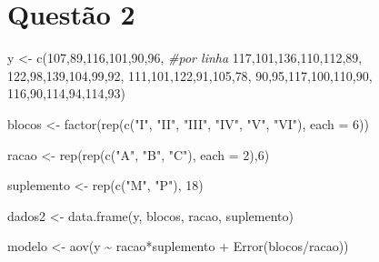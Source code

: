 \documentclass[
]{article}
\newenvironment{Shaded}{\begin{snugshade}}{\end{snugshade}}
\newcommand{\AttributeTok}[1]{\textcolor[rgb]{0.77,0.63,0.00}{#1}}
\newcommand{\CommentTok}[1]{\textcolor[rgb]{0.56,0.35,0.01}{\textit{#1}}}
\newcommand{\DecValTok}[1]{\textcolor[rgb]{0.00,0.00,0.81}{#1}}
\newcommand{\FunctionTok}[1]{\textcolor[rgb]{0.00,0.00,0.00}{#1}}
\newcommand{\NormalTok}[1]{#1}
\newcommand{\OtherTok}[1]{\textcolor[rgb]{0.56,0.35,0.01}{#1}}
\newcommand{\SpecialCharTok}[1]{\textcolor[rgb]{0.00,0.00,0.00}{#1}}
\newcommand{\StringTok}[1]{\textcolor[rgb]{0.31,0.60,0.02}{#1}}
\begin{document}
\hypertarget{questuxe3o-2}{%
\section{Questão 2}\label{questuxe3o-2}}

\begin{Shaded}
\begin{Highlighting}[]
\NormalTok{y }\OtherTok{\textless{}{-}} \FunctionTok{c}\NormalTok{(}\DecValTok{107}\NormalTok{,}\DecValTok{89}\NormalTok{,}\DecValTok{116}\NormalTok{,}\DecValTok{101}\NormalTok{,}\DecValTok{90}\NormalTok{,}\DecValTok{96}\NormalTok{, }\CommentTok{\#por linha}
\DecValTok{117}\NormalTok{,}\DecValTok{101}\NormalTok{,}\DecValTok{136}\NormalTok{,}\DecValTok{110}\NormalTok{,}\DecValTok{112}\NormalTok{,}\DecValTok{89}\NormalTok{,}
\DecValTok{122}\NormalTok{,}\DecValTok{98}\NormalTok{,}\DecValTok{139}\NormalTok{,}\DecValTok{104}\NormalTok{,}\DecValTok{99}\NormalTok{,}\DecValTok{92}\NormalTok{,}
\DecValTok{111}\NormalTok{,}\DecValTok{101}\NormalTok{,}\DecValTok{122}\NormalTok{,}\DecValTok{91}\NormalTok{,}\DecValTok{105}\NormalTok{,}\DecValTok{78}\NormalTok{,}
\DecValTok{90}\NormalTok{,}\DecValTok{95}\NormalTok{,}\DecValTok{117}\NormalTok{,}\DecValTok{100}\NormalTok{,}\DecValTok{110}\NormalTok{,}\DecValTok{90}\NormalTok{,}
\DecValTok{116}\NormalTok{,}\DecValTok{90}\NormalTok{,}\DecValTok{114}\NormalTok{,}\DecValTok{94}\NormalTok{,}\DecValTok{114}\NormalTok{,}\DecValTok{93}\NormalTok{)}

\NormalTok{blocos }\OtherTok{\textless{}{-}} \FunctionTok{factor}\NormalTok{(}\FunctionTok{rep}\NormalTok{(}\FunctionTok{c}\NormalTok{(}\StringTok{"I"}\NormalTok{, }\StringTok{"II"}\NormalTok{, }\StringTok{"III"}\NormalTok{, }\StringTok{"IV"}\NormalTok{, }\StringTok{"V"}\NormalTok{, }\StringTok{"VI"}\NormalTok{), }\AttributeTok{each =} \DecValTok{6}\NormalTok{))}

\NormalTok{racao }\OtherTok{\textless{}{-}} \FunctionTok{rep}\NormalTok{(}\FunctionTok{rep}\NormalTok{(}\FunctionTok{c}\NormalTok{(}\StringTok{"A"}\NormalTok{, }\StringTok{"B"}\NormalTok{, }\StringTok{"C"}\NormalTok{), }\AttributeTok{each =} \DecValTok{2}\NormalTok{),}\DecValTok{6}\NormalTok{)}

\NormalTok{suplemento }\OtherTok{\textless{}{-}} \FunctionTok{rep}\NormalTok{(}\FunctionTok{c}\NormalTok{(}\StringTok{"M"}\NormalTok{, }\StringTok{"P"}\NormalTok{), }\DecValTok{18}\NormalTok{)}

\NormalTok{dados2 }\OtherTok{\textless{}{-}} \FunctionTok{data.frame}\NormalTok{(y, blocos, racao, suplemento)}

\NormalTok{modelo }\OtherTok{\textless{}{-}} \FunctionTok{aov}\NormalTok{(y }\SpecialCharTok{\textasciitilde{}}\NormalTok{ racao}\SpecialCharTok{*}\NormalTok{suplemento }\SpecialCharTok{+} \FunctionTok{Error}\NormalTok{(blocos}\SpecialCharTok{/}\NormalTok{racao))}
\end{Highlighting}
\end{Shaded}
\end{document}
